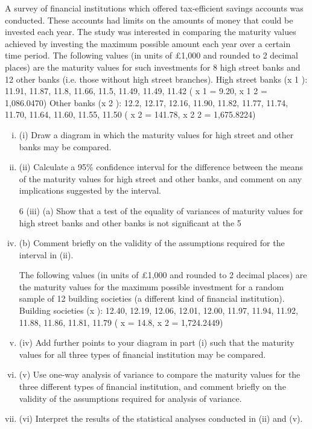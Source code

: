 \documentclass[a4paper,12pt]{article}
\begin{document}
\begin{enumerate}

A survey of financial institutions which offered tax-efficient savings accounts was conducted. These accounts had limits on the amounts of money that could be invested each year. The study was interested in comparing the maturity values achieved by investing the maximum possible amount each year over a certain time period.
The following values (in units of £1,000 and rounded to 2 decimal places) are the
maturity values for such investments for 8 high street banks and 12 other banks (i.e.
those without high street branches).
High street banks (x 1 ): 11.91, 11.87, 11.8, 11.66, 11.5, 11.49, 11.49, 11.42
( x 1 = 9.20, x 1 2 = 1,086.0470)
Other banks (x 2 ): 12.2, 12.17, 12.16, 11.90, 11.82, 11.77, 11.74, 11.70, 11.64, 11.60,
11.55, 11.50
( x 2 = 141.78, x 2 2 = 1,675.8224)
\begin{enumerate}[(i)]
\item (i) Draw a diagram in which the maturity values for high street and other banks
may be compared.
\item 
(ii) Calculate a 95\% confidence interval for the difference between the means of the maturity values for high street and other banks, and comment on any
implications suggested by the interval.
\item [6]
(iii) (a)
Show that a test of the equality of variances of maturity values for high street banks and other banks is not significant at the 5%
\item (b)
Comment briefly on the validity of the assumptions required for the interval in (ii).

The following values (in units of £1,000 and rounded to 2 decimal places) are the
maturity values for the maximum possible investment for a random sample of 12
building societies (a different kind of financial institution).
Building societies (x  ): 12.40, 12.19, 12.06, 12.01, 12.00, 11.97, 11.94, 11.92, 11.88,
11.86, 11.81, 11.79
( x  = 14.8, x  2 = 1,724.2449)
\item (iv) Add further points to your diagram in part (i) such that the maturity values for
all three types of financial institution may be compared.
\item (v) Use one-way analysis of variance to compare the maturity values for the three different types of financial institution, and comment briefly on the validity of
the assumptions required for analysis of variance.
\item (vi) Interpret the results of the statistical analyses conducted in (ii) and (v).
\end{enumerate}


\end{enumerate}
\end{document}
